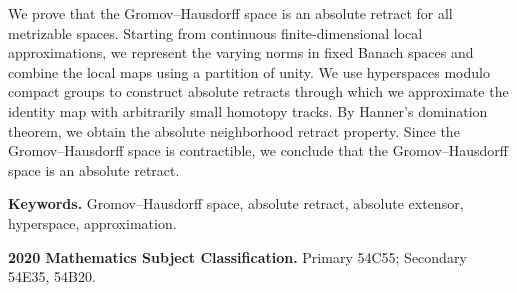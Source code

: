 We prove that the Gromov--Hausdorff space is an absolute retract for all metrizable spaces. Starting from continuous finite-dimensional local approximations, we represent the varying norms in fixed Banach spaces and combine the local maps using a partition of unity. We use hyperspaces modulo compact groups to construct absolute retracts through which we approximate the identity map with arbitrarily small homotopy tracks. By Hanner's domination theorem, we obtain the absolute neighborhood retract property. Since the Gromov--Hausdorff space is contractible, we conclude that the Gromov--Hausdorff space is an absolute retract.
\par\smallskip
\noindent\textbf{Keywords.} Gromov--Hausdorff space, absolute retract, absolute extensor, hyperspace, approximation.

\par\smallskip
\noindent\textbf{2020 Mathematics Subject Classification.} Primary 54C55; Secondary 54E35, 54B20.
